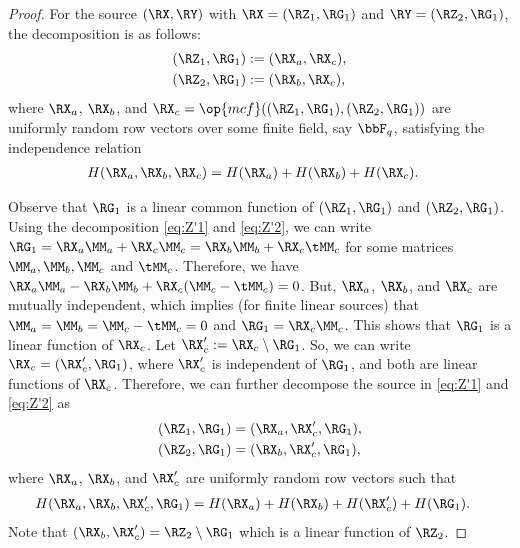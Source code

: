 \begin{proof}
For the source $(\RX, \RY)$ with $\RX=(\RZ_1, \RG_1)$ and $\RY=(\RZ_2, \RG_1)$, the decomposition is as follows: 
\begin{align}
        (\RZ_1, \RG_1) &:= (\RX_a ,\RX_c), \label{eq:Z'1}\\
        (\RZ_2, \RG_1) &:= (\RX_b ,\RX_c),\label{eq:Z'2}
\end{align}
where $\RX_a$, $\RX_b$, and $\RX_c = \op{mcf}((\RZ_1, \RG_1), (\RZ_2, \RG_1))$ are uniformly random row vectors over some finite field, say $\bbF_q$, satisfying the independence relation
\begin{align}
      H(\RX_a,\RX_b,\RX_c) &= H(\RX_a)+H(\RX_b)+H(\RX_c)\label{eq:XG}.
\end{align}

Observe that $\RG_1$ is a linear common function of $(\RZ_1, \RG_1)$ and $(\RZ_2, \RG_1)$. Using the decomposition \eqref{eq:Z'1} and \eqref{eq:Z'2}, we can write $\RG_1= \RX_a\MM_a+\RX_c\MM_c =\RX_b\MM_b+\RX_c\tMM_c$ for some matrices $\MM_a,\MM_b,\MM_c$ and $\tMM_c$. Therefore, we have $\RX_a\MM_a-\RX_b\MM_b +\RX_c(\MM_c -\tMM_c)=0$. But, $\RX_a$, $\RX_b$, and $\RX_c$ are mutually independent, which implies (for finite linear sources) that $\MM_a=\MM_b=\MM_c -\tMM_c=0$ and $\RG_1= \RX_c\MM_c$. This shows that $\RG_1$ is a linear function of $\RX_c$.
Let $\RX'_c := \RX_c \setminus \RG_1$. So, we can write $\RX_c=(\RX'_c, \RG_1)$, where $\RX'_c$ is independent of $\RG_1$, and both are linear functions of $\RX_c$. Therefore, we can further decompose the source in \eqref{eq:Z'1} and \eqref{eq:Z'2} as
\begin{align}
        (\RZ_1, \RG_1) &= (\RX_a ,\RX'_c,\RG_1), \label{eq:Z'1_decomp}\\
        (\RZ_2, \RG_1) &= (\RX_b ,\RX'_c, \RG_1),\label{eq:Z'2_decomp}
\end{align}
where $\RX_a$, $\RX_b$, and $\RX'_c$ are uniformly random row vectors such that 
\begin{align}
      H(\RX_a,\RX_b,\RX'_c,\RG_1) &= H(\RX_a)+H(\RX_b)+H(\RX'_c)+H(\RG_1)\label{eq:XG_decomp}.
\end{align}
Note that $(\RX_b ,\RX'_c)=\RZ_2 \setminus \RG_1$ which is a linear function of $\RZ_2$.


\end{proof}
